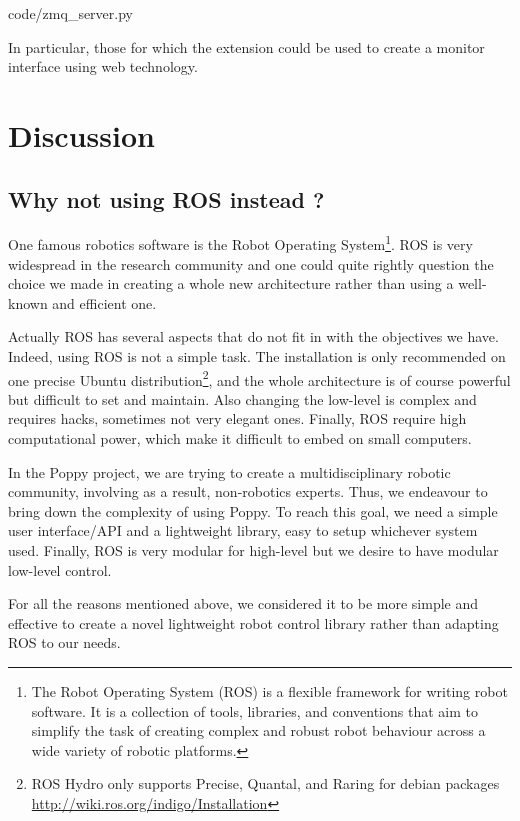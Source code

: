 
    {code/zmq_server.py}


In particular, those for which the  extension could be used to create a monitor interface using web technology.



\section{Discussion} %

\subsection{Why not using ROS instead ?} %

One famous robotics software is the Robot Operating System\footnote{The Robot Operating System (ROS) is a flexible framework for writing robot software. It is a collection of tools, libraries, and conventions that aim to simplify the task of creating complex and robust robot behaviour across a wide variety of robotic platforms.}. ROS is very widespread in the research community and one could quite rightly question the choice we made in creating a whole new architecture rather than using a well-known and efficient one.

Actually ROS has several aspects that do not fit in with the objectives we have. Indeed, using ROS is not a simple task. The installation is only recommended on one precise Ubuntu distribution\footnote{ROS Hydro only supports Precise, Quantal, and Raring for debian packages \url{http://wiki.ros.org/indigo/Installation}}, and the whole architecture is of course powerful but difficult to set and maintain. Also changing the low-level is complex and requires hacks, sometimes not very elegant ones. Finally, ROS require high computational power, which make it difficult to embed on small computers.

In the Poppy project, we are trying to create a multidisciplinary robotic community, involving as a result, non-robotics experts. Thus, we endeavour to bring down the complexity of using Poppy. To reach this goal, we need a simple user interface/API and a lightweight library, easy to setup whichever system used. Finally, ROS is very modular for high-level but we desire to have modular low-level control.

For all the reasons mentioned above, we considered it to be more simple and effective to create a novel lightweight robot control library rather than adapting ROS to our needs.


